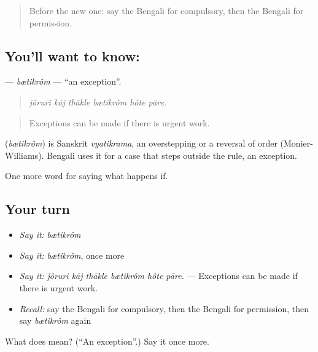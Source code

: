 \begin{quote}
Before the new one: say the Bengali for compulsory, then the Bengali for permission.
\end{quote}

\subsection*{You'll want to know: }
\textbf{} — \emph{bætikrôm} — \textquotedblleft{}an exception\textquotedblright{}.

\begin{quote}
     
\end{quote}

\begin{quote}
\emph{jôruri kāj thākle bætikrôm hôte pāre.}
\end{quote}

\begin{quote}
Exceptions can be made if there is urgent work.
\end{quote}

\begin{cousinweb}
\textbf{} (\emph{bætikrôm}) is Sanskrit \emph{vyatikrama}, an overstepping or a reversal of order (Monier-Williams). Bengali uses it for a case that steps outside the rule, an exception.
\end{cousinweb}

\begin{grammarlens}[title={What you've built}]
One more word for saying what happens if.
\end{grammarlens}

\subsection*{Your turn}
\begin{itemize}
\raggedright
  \item \emph{Say it:} \emph{bætikrôm}
  \item \emph{Say it:} \emph{bætikrôm}, once more
  \item \emph{Say it:} \emph{jôruri kāj thākle bætikrôm hôte pāre.} — Exceptions can be made if there is urgent work.
  \item \emph{Recall:} say the Bengali for compulsory, then the Bengali for permission, then say \emph{bætikrôm} again
\end{itemize}

\begin{tcolorbox}[breakable,colback=teal!4,colframe=teal!35!black,title={Before you move on}]
What does  mean? (\textquotedblleft{}An exception\textquotedblright{}.) Say it once more.
\end{tcolorbox}
